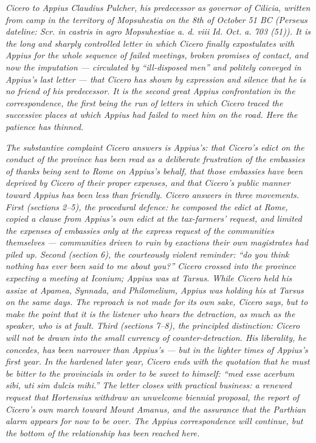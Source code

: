 
\textit{Cicero to Appius Claudius Pulcher, his
predecessor as governor of Cilicia, written from camp
in the territory of Mopsuhestia on the 8th of October
51 BC (Perseus dateline: \textit{Scr. in castris in agro
Mopsuhestiae a. d. viii Id. Oct. a. 703 (51)}). It is
the long and sharply controlled letter in which Cicero
finally expostulates with Appius for the whole sequence
of failed meetings, broken promises of contact, and now
the imputation --- circulated by ``ill-disposed men''
and politely conveyed in Appius's last letter --- that
Cicero has shown by expression and silence that he is
no friend of his predecessor. It is the second great
Appius confrontation in the correspondence, the first
being the run of letters in which Cicero traced the
successive places at which Appius had failed to meet him
on the road. Here the patience has thinned.}

\textit{The substantive complaint Cicero answers is
Appius's: that Cicero's edict on the conduct of the
province has been read as a deliberate frustration of
the embassies of thanks being sent to Rome on Appius's
behalf, that those embassies have been deprived by
Cicero of their proper expenses, and that Cicero's
public manner toward Appius has been less than friendly.
Cicero answers in three movements. First (sections
2--5), the procedural defence: he composed the edict at
Rome, copied a clause from Appius's own edict at the
tax-farmers' request, and limited the expenses of
embassies only at the express request of the
communities themselves --- communities driven to ruin
by exactions their own magistrates had piled up. Second
(section 6), the courteously violent reminder: ``do you
think nothing has ever been said to me about you?''
Cicero crossed into the province expecting a meeting at
Iconium; Appius was at Tarsus. While Cicero held his
assize at Apamea, Synnada, and Philomelium, Appius was
holding his at Tarsus on the same days. The reproach
is not made for its own sake, Cicero says, but to make
the point that it is the listener who hears the
detraction, as much as the speaker, who is at fault.
Third (sections 7--8), the principled distinction:
Cicero will not be drawn into the small currency of
counter-detraction. His liberality, he concedes, has
been narrower than Appius's --- but in the lighter
times of Appius's first year. In the hardened later
year, Cicero ends with the quotation that he must be
bitter to the provincials in order to be sweet to
himself: ``\textit{med esse acerbum sibi, uti sim
dulcis mihi}.'' The letter closes with practical
business: a renewed request that Hortensius withdraw an
unwelcome biennial proposal, the report of Cicero's own
march toward Mount Amanus, and the assurance that the
Parthian alarm appears for now to be over. The Appius
correspondence will continue, but the bottom of the
relationship has been reached here.}
